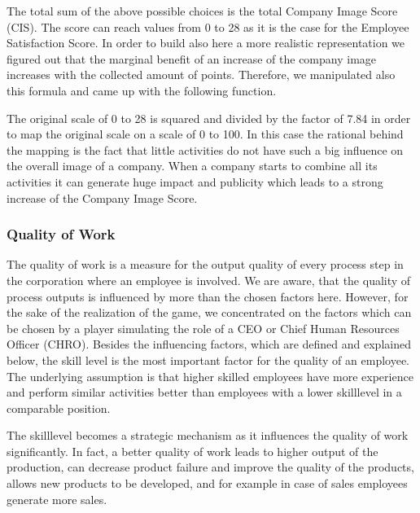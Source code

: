The total sum of the above possible choices is the total Company Image Score (CIS). The score can reach values from 0 to 28 as it is the case for the Employee Satisfaction Score. In order to build also here a more realistic representation we figured out that the marginal benefit of an increase of the company image increases with the collected amount of points. Therefore, we manipulated also this formula and came up with the following function.


The original scale of 0 to 28 is squared and divided by the factor of 7.84 in order to map the original scale on a scale of 0 to 100. In this case the rational behind the mapping is the fact that little activities do not have such  a big influence on the overall image of a company. When a company starts to combine all its activities it can generate huge impact and publicity which leads to a strong increase of the Company Image Score.

\subsubsection{Quality of Work}
The quality of work is a measure for the output quality of every process step in the corporation where an employee is involved. We are aware, that the quality of process outputs is influenced by more than the chosen factors here. However, for the sake of the realization of the game, we concentrated on the factors which can be chosen by a player simulating the role of a CEO or Chief Human Resources Officer (CHRO). Besides the influencing factors, which are defined and explained below, the skill level is the most important factor for the quality of an employee. The underlying assumption is that higher skilled employees have more experience and perform similar activities better than employees with a lower skilllevel in a comparable position.

The skilllevel becomes a strategic mechanism as it influences the quality of work significantly. In fact, a better quality of work leads to higher output of the production, can decrease product failure and improve the quality of the products, allows new products to be developed, and for example in case of sales employees generate more sales. 

